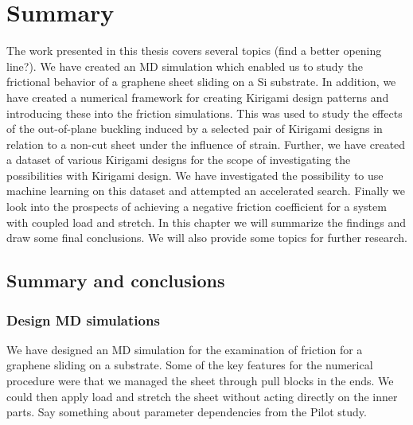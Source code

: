 \chapter{Summary}\label{chap:summary}

The work presented in this thesis covers several topics (find a better opening
line?). We have created an \acrshort{MD} simulation which enabled us to study
the frictional behavior of a graphene sheet sliding on a Si substrate. In
addition, we have created a numerical framework for creating Kirigami design
patterns and introducing these into the friction simulations. This was used to
study the effects of the out-of-plane buckling induced by a selected pair of
Kirigami designs in relation to a non-cut sheet under the influence of strain.
Further, we have created a dataset of various Kirigami designs for the scope of
investigating the possibilities with Kirigami design. We have investigated the
possibility to use machine learning on this dataset and attempted an accelerated
search. Finally we look into the prospects of achieving a negative friction
coefficient for a system with coupled load and stretch. In this chapter we will
summarize the findings and draw some final conclusions. We will also provide
some topics for further research.

\section{Summary and conclusions}

\subsection{Design MD simulations}
We have designed an \acrshort{MD} simulation for the examination of friction for a graphene sliding on a substrate. Some of the key features for the numerical procedure were that we managed the sheet through pull blocks in the ends. We could then apply load and stretch the sheet without acting directly on the inner parts. Say something about parameter dependencies from the Pilot study. 

